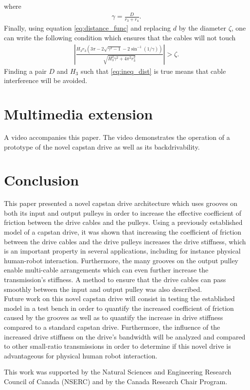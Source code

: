 \documentclass[10pt,cleanfoot]{asme2ej}
\newcommand\abs[1]{\left|#1\right|}
\begin{document}
where
\begin{align}
\gamma = \frac{D}{r_3+r_4}.
\end{align}
Finally, using equation \eqref{eq:distance_func} and replacing $d$ by the diameter $\zeta$, one can write the following condition which ensures that the cables will not touch
\begin{align}
\abs{\frac{H_3r_3\left(3\pi-2\sqrt{\gamma^2-1}-2\sin^{-1}(1/\gamma)\right)}{\sqrt{H_3^2\gamma^2+4\pi^2r_3^2}}} > \zeta.
\label{eq:ineq_dist}
\end{align}
Finding a pair $D$ and $H_3$ such that \eqref{eq:ineq_dist} is true means that cable interference will be avoided.
\section{Multimedia extension}
A video accompanies this paper. The video demonstrates the operation of a prototype of the novel capstan drive as well as its backdrivability.
\section{Conclusion}
This paper presented a novel capstan drive architecture which uses grooves on both its input and output pulleys in order to increase the effective coefficient of friction between the drive cables and the pulleys. Using a previously established model of a capstan drive, it was shown that increasing the coefficient of friction between the drive cables and the drive pulleys increases the drive stiffness, which is an important property in several applications, including for instance physical human-robot interaction. Furthermore, the many grooves on the output pulley enable multi-cable arrangements which can even further increase the transmission's stiffness. A method to ensure that the drive cables can pass smoothly between the input and output pulley was also described. \\
Future work on this novel capstan drive will consist in testing the established model in a test bench in order to quantify the increased coefficient of friction caused by the grooves as well as to quantify the increase in drive stiffness compared to a standard capstan drive. Furthermore, the influence of the increased drive stiffness on the drive's bandwidth will be analyzed and compared to other small-ratio transmissions in order to determine if this novel drive is advantageous for physical human robot interaction.
\begin{acknowledgment}
This work was supported by the Natural Sciences and Engineering Research Council of Canada (NSERC) and by the
Canada Research Chair Program.
\end{acknowledgment}
\end{document}
